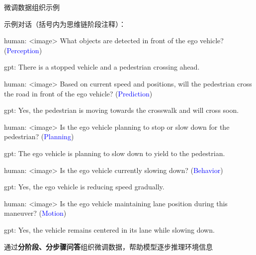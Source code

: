 \documentclass[serif]{beamer}
\begin{document}
\begin{frame}{微调数据组织示例}

示例对话（括号内为思维链阶段注释）：

\scriptsize
\begin{tcolorbox}[listing only, listing options={
    language=,
    basicstyle=\ttfamily\tiny,
    escapeinside={(*@}{@*)}
}]
human: <image> What objects are detected in front of the ego vehicle? (\textcolor{blue}{Perception})

gpt: There is a stopped vehicle and a pedestrian crossing ahead.

\vspace{6pt}
human: <image> Based on current speed and positions, will the pedestrian cross the road in front of the ego vehicle? (\textcolor{blue}{Prediction})

gpt: Yes, the pedestrian is moving towards the crosswalk and will cross soon.

\vspace{6pt}
human: <image> Is the ego vehicle planning to stop or slow down for the pedestrian? (\textcolor{blue}{Planning})

gpt: The ego vehicle is planning to slow down to yield to the pedestrian.

\vspace{6pt}
human: <image> Is the ego vehicle currently slowing down? (\textcolor{blue}{Behavior})

gpt: Yes, the ego vehicle is reducing speed gradually.

\vspace{6pt}
human: <image> Is the ego vehicle maintaining lane position during this maneuver? (\textcolor{blue}{Motion})

gpt: Yes, the vehicle remains centered in its lane while slowing down.
\end{tcolorbox}


\normalsize
\vspace{0.5em}
通过\textbf{分阶段、分步骤问答}组织微调数据，帮助模型逐步推理环境信息
\end{frame}
\end{document}
